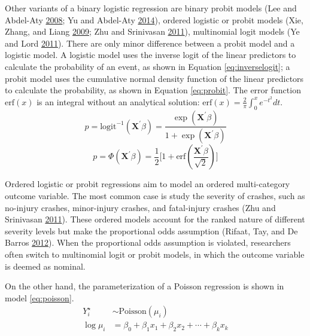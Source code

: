 \documentclass[12pt]{book}
\numberwithin{equation}{chapter}
\begin{document}
Other variants of a binary logistic regression are binary probit models (Lee and Abdel-Aty \protect\hyperlink{ref-lee2008presence}{2008}; Yu and Abdel-Aty \protect\hyperlink{ref-yu2014using}{2014}), ordered logistic or probit models (Xie, Zhang, and Liang \protect\hyperlink{ref-xie2009crash}{2009}; Zhu and Srinivasan \protect\hyperlink{ref-zhu2011comprehensive}{2011}), multinomial logit models (Ye and Lord \protect\hyperlink{ref-ye2011investigation}{2011}). There are only minor difference between a probit model and a logistic model. A logistic model uses the inverse logit of the linear predictors to calculate the probability of an event, as shown in Equation \eqref{eq:inverselogit}; a probit model uses the cumulative normal density function of the linear predictors to calculate the probability, as shown in Equation \eqref{eq:probit}. The error function \(\text{erf}(x)\) is an integral without an analytical solution: \(\text{erf}(x) = \frac{2}{\pi}\int_0^xe^{-t^2}dt\).
\begin{equation}
p = \text{logit}^{-1}(\mathbf{X}^\prime\beta) = \frac{\exp (\mathbf{X}^\prime\beta)}{1 + \exp (\mathbf{X}^\prime\beta)}
\label{eq:inverselogit}
\end{equation}
\begin{equation}
p = \Phi(\mathbf{X}^\prime\beta) = \frac{1}{2}\Big[1+\text{erf}(\frac{\mathbf{X}^\prime\beta}{\sqrt 2})\Big]
\label{eq:probit}
\end{equation}

Ordered logistic or probit regressions aim to model an ordered multi-category outcome variable. The most common case is study the severity of crashes, such as no-injury crashes, minor-injury crashes, and fatal-injury crashes (Zhu and Srinivasan \protect\hyperlink{ref-zhu2011comprehensive}{2011}). These ordered models account for the ranked nature of different severity levels but make the proportional odds assumption (Rifaat, Tay, and De Barros \protect\hyperlink{ref-rifaat2012severity}{2012}). When the proportional odds assumption is violated, researchers often switch to multinomial logit or probit models, in which the outcome variable is deemed as nominal.

On the other hand, the parameterization of a Poisson regression is shown in model \eqref{eq:poisson}.
\begin{equation}
\begin{split}
Y_i^\star & \sim \text{Poisson}(\mu_i) \\
\log\mu_i & = \beta_0 + \beta_1x_1 + \beta_2x_2 + \cdots + \beta_kx_k
\label{eq:poisson}
\end{split}
\end{equation}
\end{document}
